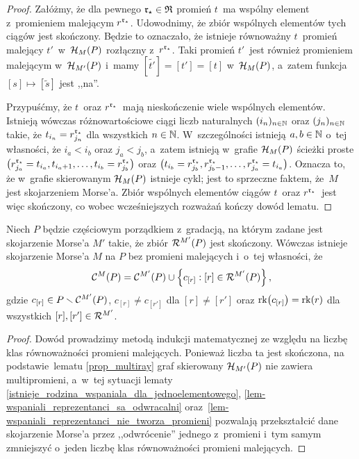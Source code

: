 \begin{proof}
Załóżmy, że dla pewnego $\mathfrak{r}_\star\in\mathfrak{R}$ promień $t$~ma wspólny element z~promieniem malejącym $r^{\mathfrak{r}_\star}$. Udowodnimy, że zbiór wspólnych elementów tych ciągów jest skończony. Będzie to oznaczało, że istnieje równoważny $t$~promień malejący $t'$~w~$\mathcal{H}_{M}(P)$ rozłączny z~$r^{\mathfrak{r}_\star}$. Taki promień $t'$~jest również promieniem malejącym w~$\mathcal{H}_{M'}(P)$ i~mamy $\left[\tilde{t'}\right]=[t']=[t]$ w~$\mathcal{H}_M(P)$, a~zatem funkcja $[s]\mapsto [\tilde{s}]$ jest ,,na''.

Przypuśćmy, że $t$~oraz $r^{\mathfrak{r}_\star}$~mają nieskończenie wiele wspólnych elementów. Istnieją wówczas różnowartościowe ciągi liczb naturalnych $(i_n)_{n\in\mathbb{N}}$ oraz $(j_n)_{n\in\mathbb{N}}$ takie, że $t_{i_n}=r^{\mathfrak{r}_\star}_{j_n}$ dla wszystkich $n\in\mathbb{N}$. W~szczególności istnieją $a,b\in\mathbb{N}$ o~tej własności, że $i_a<i_b$ oraz $j_a<j_b$, a~zatem istnieją w~grafie $\mathcal{H}_{M}(P)$ ścieżki proste $\bigl(r^{\mathfrak{r}_\star}_{j_a}=t_{i_a},t_{i_a+1},\ldots, t_{i_b}=r^{\mathfrak{r}_\star}_{j_b}\bigr)$ oraz $\bigl(t_{i_b}=r^{\mathfrak{r}_\star}_{j_b},r^{\mathfrak{r}_\star}_{j_b-1},\ldots,r^{\mathfrak{r}_\star}_{j_a}=t_{i_a}\bigr)$. Oznacza to, że w~grafie skierowanym $\mathcal{H}_{M}(P)$ istnieje cykl; jest to sprzeczne faktem, że~$M$ jest skojarzeniem Morse'a. Zbiór wspólnych elementów ciągów $t$~oraz $r^{\mathfrak{r}_\star}$~jest więc skończony, co wobec wcześniejszych rozważań kończy dowód lematu.
\end{proof}

\begin{stw}\label{reversing_stw}
Niech $P$ będzie częściowym porządkiem z~gradacją, na którym zadane jest skojarzenie Morse'a $M'$ takie, że zbiór $\mathcal{R}^{M'}(P)$ jest skończony. Wówczas istnieje skojarzenie Morse'a $M$ na $P$ bez promieni malejących i~o~tej własności, że \[\mathcal{C}^{M}(P)=\mathcal{C}^{M'}(P)\cup \left\{c_{[r]}:[r]\in\mathcal{R}^{M'}(P)\right\},\] gdzie $c_{[r]}\in P\smallsetminus \mathcal{C}^{M'}(P)$, $c_{[r]}\not=c_{[r']}$ dla $[r]\not=[r']$ oraz $\operatorname{rk}\bigl(c_{[r]}\bigr)=\operatorname{rk}(r)$ dla wszystkich $[r],[r']\in\mathcal{R}^{M'}$. 
\end{stw}
\begin{proof}
Dowód prowadzimy metodą indukcji matematycznej ze względu na liczbę klas równoważności promieni malejących. Ponieważ liczba ta jest skończona, na podstawie~lematu \ref{prop_multiray} graf skierowany $\mathcal{H}_{M'}(P)$ nie zawiera multipromieni, a~w~tej sytuacji lematy \ref{istnieje_rodzina_wspaniala_dla_jednoelementowego}, \ref{lem-wspaniali_reprezentanci_sa_odwracalni} oraz~\ref{lem-wspaniali_reprezentanci_nie_tworza_promieni} pozwalają przekształcić dane skojarzenie Morse'a przez ,,odwrócenie'' jednego z~promieni i~tym samym zmniejszyć o~jeden liczbę klas równoważności promieni malejących.
\end{proof}

